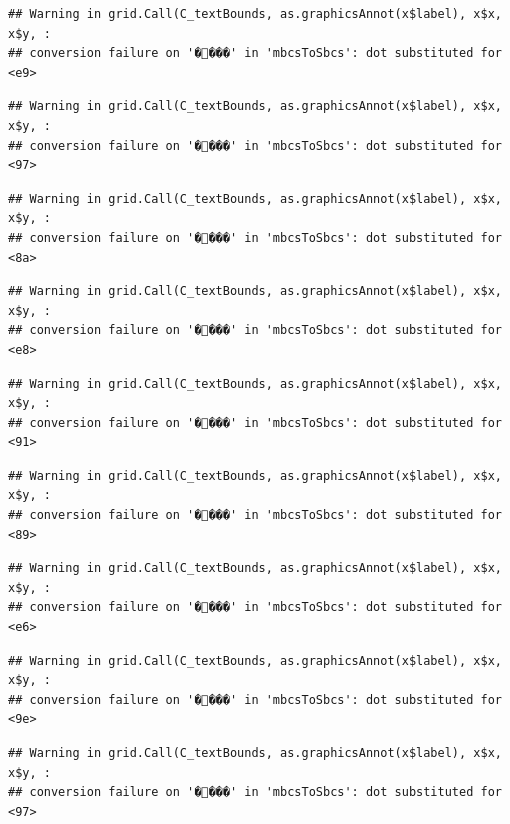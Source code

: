 \documentclass[
]{article}
\begin{document}
\begin{verbatim}
## Warning in grid.Call(C_textBounds, as.graphicsAnnot(x$label), x$x, x$y, :
## conversion failure on '����' in 'mbcsToSbcs': dot substituted for <e9>
\end{verbatim}

\begin{verbatim}
## Warning in grid.Call(C_textBounds, as.graphicsAnnot(x$label), x$x, x$y, :
## conversion failure on '����' in 'mbcsToSbcs': dot substituted for <97>
\end{verbatim}

\begin{verbatim}
## Warning in grid.Call(C_textBounds, as.graphicsAnnot(x$label), x$x, x$y, :
## conversion failure on '����' in 'mbcsToSbcs': dot substituted for <8a>
\end{verbatim}

\begin{verbatim}
## Warning in grid.Call(C_textBounds, as.graphicsAnnot(x$label), x$x, x$y, :
## conversion failure on '����' in 'mbcsToSbcs': dot substituted for <e8>
\end{verbatim}

\begin{verbatim}
## Warning in grid.Call(C_textBounds, as.graphicsAnnot(x$label), x$x, x$y, :
## conversion failure on '����' in 'mbcsToSbcs': dot substituted for <91>
\end{verbatim}

\begin{verbatim}
## Warning in grid.Call(C_textBounds, as.graphicsAnnot(x$label), x$x, x$y, :
## conversion failure on '����' in 'mbcsToSbcs': dot substituted for <89>
\end{verbatim}

\begin{verbatim}
## Warning in grid.Call(C_textBounds, as.graphicsAnnot(x$label), x$x, x$y, :
## conversion failure on '����' in 'mbcsToSbcs': dot substituted for <e6>
\end{verbatim}

\begin{verbatim}
## Warning in grid.Call(C_textBounds, as.graphicsAnnot(x$label), x$x, x$y, :
## conversion failure on '����' in 'mbcsToSbcs': dot substituted for <9e>
\end{verbatim}

\begin{verbatim}
## Warning in grid.Call(C_textBounds, as.graphicsAnnot(x$label), x$x, x$y, :
## conversion failure on '����' in 'mbcsToSbcs': dot substituted for <97>
\end{verbatim}
\end{document}
